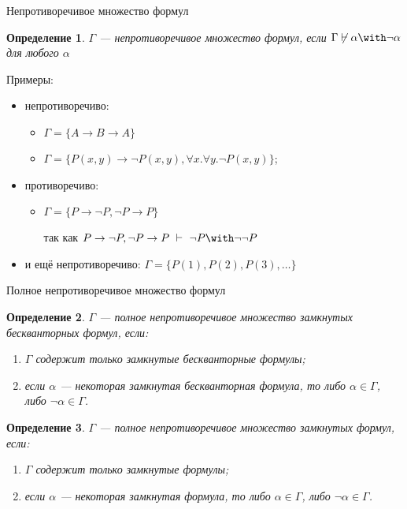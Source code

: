 \documentclass[aspectratio=169]{beamer}
\newtheorem{dfn}{Определение}[section]
\begin{document}
\begin{frame}{Непротиворечивое множество формул}
\begin{dfn}$\Gamma$ --- \emph{непротиворечивое множество формул},
если $\Gamma\not\vdash\alpha\with\neg\alpha$ для любого $\alpha$
\end{dfn}\pause

Примеры:
\begin{itemize}
\item непротиворечиво: \begin{itemize}
\item $\Gamma = \{A \rightarrow B \rightarrow A\}$\pause
\item $\Gamma = \{P(x,y)\rightarrow\neg P(x,y), \forall x.\forall y.\neg P(x,y)\}$;
\end{itemize}\pause
\item противоречиво: \begin{itemize}
\item $\Gamma = \{P\rightarrow\neg P, \neg P \rightarrow P\}$

так как
$P\rightarrow\neg P, \neg P \rightarrow P \ \vdash\  \neg P \with \neg\neg P$\pause
\end{itemize}
\item и ещё непротиворечиво: $\Gamma = \{P(1), P(2), P(3), \dots\}$
\end{itemize}
\end{frame}

\begin{frame}{Полное непротиворечивое множество формул}
\begin{dfn}$\Gamma$ --- \emph{полное} непротиворечивое множество замкнутых бескванторных формул,
если:
\begin{enumerate}\item $\Gamma$ содержит только замкнутые бескванторные формулы;
\item если $\alpha$ --- некоторая замкнутая бескванторная формула, то либо $\alpha\in\Gamma$, либо $\neg\alpha\in\Gamma$.
\end{enumerate}
\end{dfn}\pause

\begin{dfn}$\Gamma$ --- \emph{полное} непротиворечивое множество замкнутых формул, если:
\begin{enumerate}\item $\Gamma$ содержит только замкнутые формулы;
\item если $\alpha$ --- некоторая замкнутая формула, то либо $\alpha \in \Gamma$, либо $\neg\alpha \in \Gamma$.
\end{enumerate}
\end{dfn}
\end{frame}
\end{document}

